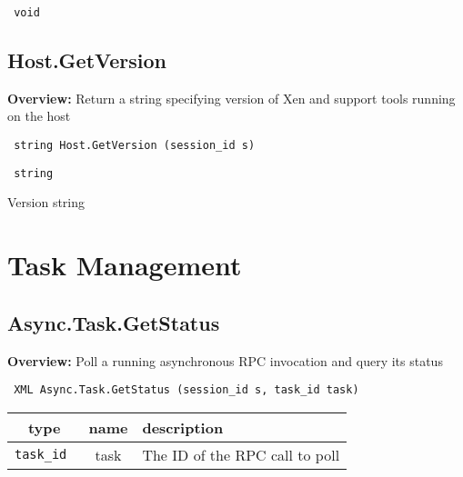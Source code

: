\vspace{0.3cm}

{\tt 
void
}



\vspace{0.3cm}
\vspace{0.3cm}
\vspace{0.3cm}

\subsection{Host.GetVersion}

{\bf Overview:} 
Return a string specifying version of Xen and support tools running on the host

\begin{verbatim} string Host.GetVersion (session_id s)\end{verbatim}


\vspace{0.3cm}

{\tt 
string
}


Version string
\vspace{0.3cm}
\vspace{0.3cm}
\vspace{0.3cm}



\newpage\section{Task Management}

\subsection{Async.Task.GetStatus}

{\bf Overview:} 
Poll a running asynchronous RPC invocation and query its status

\begin{verbatim} XML Async.Task.GetStatus (session_id s, task_id task)\end{verbatim}



 
\vspace{0.3cm}
\begin{tabular}{|c|c|p{7cm}|}
 \hline
{\bf type} & {\bf name} & {\bf description} \\ \hline
{\tt task\_id } & task & The ID of the RPC call to poll \\ \hline 

\end{tabular}

